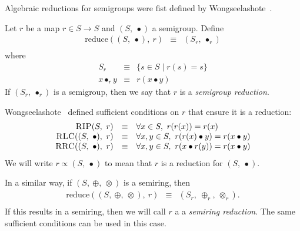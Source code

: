 
Algebraic reductions for semigroups were fist defined
by Wongseelashote~\cite{Wongseelashote79}.

Let $r$ be a map $r \in S \rightarrow S$  and
$(S,\ \bullet)$ a semigroup.
Define 
\[
\begin{array}{rcl}
  \mathrm{reduce}((S,\ \bullet),\ r) & \equiv & (S_r,\ \bullet_r) \\
\end{array}  
\]
where
\[
\begin{array}{rcl} 
S_r           & \equiv & \{s \in S\mid r(s) = s\} \\
x \bullet_r y & \equiv & r(x \bullet y)
\end{array}  
\]
If $(S_r, \ \bullet_r)$ is a semigroup, then
we say that $r$ is a \emph{semigroup reduction}.

Wongseelashote~\cite{Wongseelashote79} defined sufficient
conditions on $r$ that ensure it is a reduction: 
\[
\begin{array}{rcl}
\text{\textsc{RIP}}(S,\ r)    
    & \equiv 
    & \forall x \in S,\ r(r(x)) = r(x)\\
\text{\textsc{RLC}}((S,\ \bullet),\ r)
    & \equiv 
    & \forall x, y \in S,\ r(r(x) \bullet y) = r(x \bullet y)\\ 
\text{\textsc{RRC}}((S,\ \bullet),\ r)
    & \equiv 
    & \forall x, y \in S,\ r(x \bullet r(y)) = r(x \bullet y)\\ 
\end{array}   
\]
We will write $r \propto (S,\ \bullet)$ to mean that
$r$ is a reduction for $(S,\ \bullet)$. 


In a similar way, if
$(S,\ \oplus,\ \otimes)$ is a semiring, then
\[
\begin{array}{rcl}
  \mathrm{reduce}((S,\ \oplus,\ \otimes),\ r) & \equiv & (S_r,\ \oplus_r,\ \otimes_r). \\
\end{array}  
\]
If this results in a semiring, then we will call $r$ a
a \emph{semiring reduction}.
The same sufficient conditions can be used in this case. 
